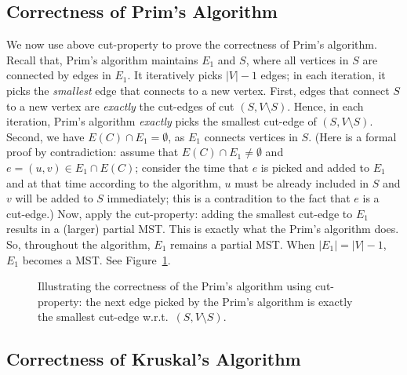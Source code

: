 \subsection*{Correctness of Prim's Algorithm}

We now use above cut-property to prove the correctness of Prim's algorithm.
Recall that, Prim's algorithm maintains $E_1$ and $S$, where all vertices in $S$ are connected by edges in $E_1$.
It iteratively picks $|V|-1$ edges;
in each iteration, it picks the \emph{smallest} edge that connects to a new vertex.
First, edges that connect $S$ to a new vertex are \emph{exactly} the cut-edges of cut $(S, V\setminus S)$.
Hence, in each iteration, Prim's algorithm 
\emph{exactly} picks the smallest cut-edge of $(S,V\setminus S)$.
Second, we have $E(C) \cap E_1 = \emptyset$, as $E_1$ connects vertices in $S$. (Here is a formal proof by
contradiction: assume that $E(C) \cap E_1 \neq \emptyset$ and $e = (u,v) \in E_1\cap E(C)$; 
consider the time that $e$ is picked and added to $E_1$ and at that time according to the algorithm,
$u$ must be already included in $S$ and $v$ will be added to $S$ immediately; this is a contradition
to the fact that $e$ is a cut-edge.)
Now, apply the cut-property: adding the smallest cut-edge to $E_1$ results in a (larger) partial MST.
This is exactly what the Prim's algorithm does.
So, throughout the algorithm, $E_1$ remains a partial MST.
When $|E_1| = |V|-1$, $E_1$ becomes a MST.
See Figure~\ref{fig:prim}.

\begin{figure}[h]
\centering{}
\caption{Illustrating the correctness of the Prim's algorithm using cut-property:
the next edge picked by the Prim's algorithm is exactly the smallest cut-edge w.r.t.\ $(S,V\setminus S)$.}
\label{fig:prim}
\end{figure}


\subsection*{Correctness of Kruskal's Algorithm}

